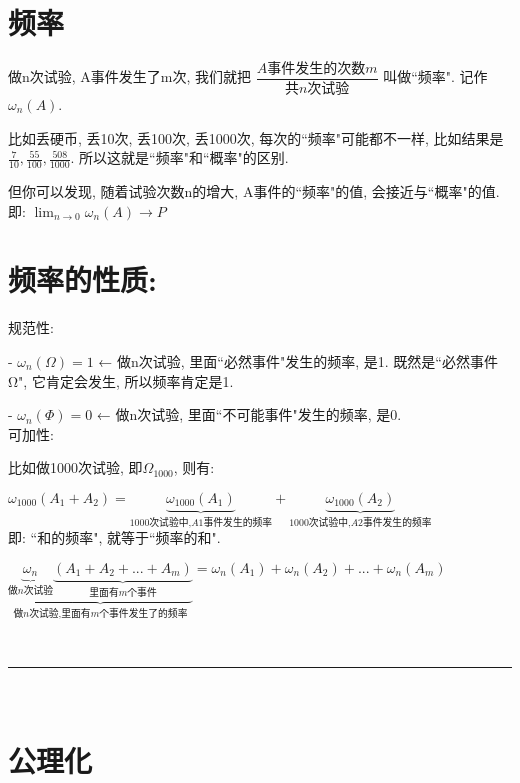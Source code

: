 \documentclass[UTF8]{ctexart}
\begin{document}
\section{频率}

做n次试验, A事件发生了m次, 我们就把 $\dfrac{A\text{事件发生的次数}m}{\text{共}n\text{次试验}}$ 叫做``频率". 记作$\omega _n\left( A \right) $.

比如丢硬币, 丢10次, 丢100次, 丢1000次, 每次的``频率"可能都不一样, 比如结果是 $\frac{7}{10},\frac{55}{100},\frac{508}{1000} $. 所以这就是``频率"和``概率"的区别.

但你可以发现, 随着试验次数n的增大, A事件的``频率"的值, 会接近与``概率"的值. 即: $ \lim_{n→0}\omega _n\left( A \right)  \to P $


\section{频率的性质:}

规范性: 

- $\omega _n\left( \varOmega \right) =1$ ← 做n次试验, 里面``必然事件"发生的频率, 是1.  
既然是``必然事件Ω", 它肯定会发生, 所以频率肯定是1.


- $\omega _n\left( \varPhi \right) =0$ ← 做n次试验, 里面``不可能事件"发生的频率, 是0. \\



可加性: 


比如做1000次试验, 即$ \varOmega_{1000}$, 则有: 

$\omega _{1000}\left( A_1+A_2 \right) =\underset{1000\text{次试验中,}A1\text{事件发生的频率}}{\underbrace{\omega _{1000}\left( A_1 \right) }}+\underset{1000\text{次试验中,}A2\text{事件发生的频率}}{\underbrace{\omega _{1000}\left( A_2 \right) }}$ \\

即: ``和的频率", 就等于``频率的和".

$
\boxed{
\underset{\text{做}n\text{次试验,里面有}m\text{个事件发生了的频率}}{\underbrace{\underset{\text{做}n\text{次试验}}{\underbrace{\omega _n}}\underset{\text{里面有}m\text{个事件}}{\underbrace{\left( A_1+A_2+...+A_m \right) }}}}=\omega _n\left( A_1 \right) +\omega _n\left( A_2 \right) +...+\omega _n\left( A_m \right) 
}
$

~\\
\hrule
~\\

	
\section{公理化}
	
\end{document}
